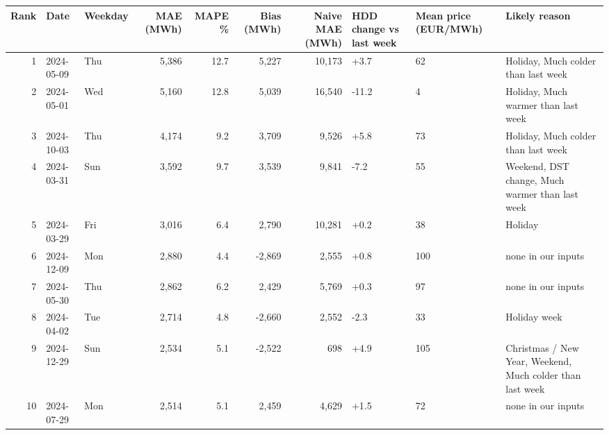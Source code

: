 \begin{tabular}{rllrrrrlll}
\toprule
Rank & Date & Weekday & MAE (MWh) & MAPE \% & Bias (MWh) & Naive MAE (MWh) & HDD change vs last week & Mean price (EUR/MWh) & Likely reason \\
\midrule
1 & 2024-05-09 & Thu & 5,386 & 12.7 & 5,227 & 10,173 & +3.7 & 62 & Holiday, Much colder than last week \\
2 & 2024-05-01 & Wed & 5,160 & 12.8 & 5,039 & 16,540 & -11.2 & 4 & Holiday, Much warmer than last week \\
3 & 2024-10-03 & Thu & 4,174 & 9.2 & 3,709 & 9,526 & +5.8 & 73 & Holiday, Much colder than last week \\
4 & 2024-03-31 & Sun & 3,592 & 9.7 & 3,539 & 9,841 & -7.2 & 55 & Weekend, DST change, Much warmer than last week \\
5 & 2024-03-29 & Fri & 3,016 & 6.4 & 2,790 & 10,281 & +0.2 & 38 & Holiday \\
6 & 2024-12-09 & Mon & 2,880 & 4.4 & -2,869 & 2,555 & +0.8 & 100 & none in our inputs \\
7 & 2024-05-30 & Thu & 2,862 & 6.2 & 2,429 & 5,769 & +0.3 & 97 & none in our inputs \\
8 & 2024-04-02 & Tue & 2,714 & 4.8 & -2,660 & 2,552 & -2.3 & 33 & Holiday week \\
9 & 2024-12-29 & Sun & 2,534 & 5.1 & -2,522 & 698 & +4.9 & 105 & Christmas / New Year, Weekend, Much colder than last week \\
10 & 2024-07-29 & Mon & 2,514 & 5.1 & 2,459 & 4,629 & +1.5 & 72 & none in our inputs \\
\bottomrule
\end{tabular}
